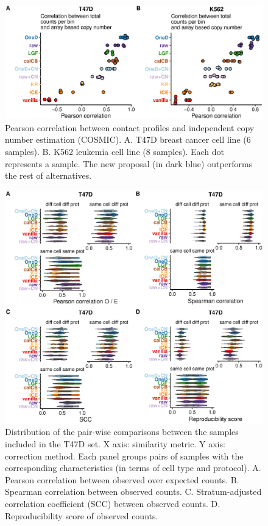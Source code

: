 \documentclass[12pt]{report}
\begin{document}
\begin{figure}[b]
	\centerline{\includegraphics[width=\textwidth]{nar_figures/supp_figure_1.eps}}
	\caption{
    Pearson correlation between contact profiles and independent copy number
	estimation (COSMIC). A. T47D breast cancer cell line (6 samples). B. K562
	leukemia cell line (8 samples). Each dot represents a sample. The new
	proposal (in dark blue) outperforms the rest of alternatives.}
\end{figure}

\begin{figure}
	\centerline{\includegraphics[width=\textwidth]{nar_figures/supp_figure_2.eps}}
    \caption{
    Distribution of the pair-wise comparisons between the samples included in
    the T47D set. X axis: similarity metric. Y axis: correction
    method. Each panel groups pairs of samples with the corresponding
    characteristics (in terms of cell type and protocol). A. Pearson correlation
    between observed over expected counts. B. Spearman correlation between
    observed counts. C. Stratum-adjusted correlation coefficient (SCC) between
    observed counts. D. Reproducibility score of observed counts.}
\end{figure}
\end{document}
